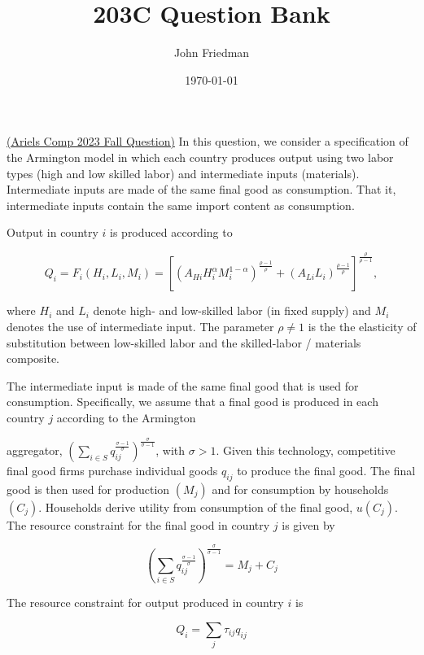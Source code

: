 \documentclass[answers]{exam}
\title{203C Question Bank}
\author{John Friedman}
\date{\today}
\begin{document}
\maketitle


\begin{questions}
    \question \href{https://economics.ucla.edu/wp-content/uploads/2023/11/MacroCompFall2023-1.pdf}{(Ariels Comp 2023 Fall Question)}
    In this question, we consider a specification of the Armington model in which each country produces output using two labor types (high and low skilled labor) and intermediate inputs (materials). Intermediate inputs are made of the same final good as consumption. That it, intermediate inputs contain the same import content as consumption.
    
    Output in country $i$ is produced according to
    
    $$
    Q_{i}=F_{i}\left(H_{i}, L_{i}, M_{i}\right)=\left[\left(A_{H i} H_{i}^{\alpha} M_{i}^{1-\alpha}\right)^{\frac{\rho-1}{\rho}}+\left(A_{L i} L_{i}\right)^{\frac{\rho-1}{\rho}}\right]^{\frac{\rho}{\rho-1}},
    $$
    
    where $H_{i}$ and $L_{i}$ denote high- and low-skilled labor (in fixed supply) and $M_{i}$ denotes the use of intermediate input. The parameter $\rho \neq 1$ is the the elasticity of substitution between low-skilled labor and the skilled-labor / materials composite.
    
    The intermediate input is made of the same final good that is used for consumption. Specifically, we assume that a final good is produced in each country $j$ according to the Armington
    
    aggregator, $\left(\sum_{i \in S} q_{i j}^{\frac{\sigma-1}{\sigma}}\right)^{\frac{\sigma}{\sigma-1}}$, with $\sigma>1$. Given this technology, competitive final good firms purchase individual goods $q_{i j}$ to produce the final good. The final good is then used for production $\left(M_{j}\right)$ and for consumption by households $\left(C_{j}\right)$. Households derive utility from consumption of the final good, $u\left(C_{j}\right)$. The resource constraint for the final good in country $j$ is given by
    
    $$
    \left(\sum_{i \in S} q_{i j}^{\frac{\sigma-1}{\sigma}}\right)^{\frac{\sigma}{\sigma-1}}=M_{j}+C_{j}
    $$
    
    The resource constraint for output produced in country $i$ is
    
    $$
    Q_{i}=\sum_{j} \tau_{i j} q_{i j}
    $$
    

\end{questions}
\end{document}
